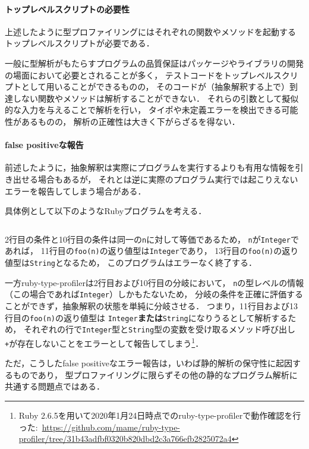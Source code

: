 \paragraph{トップレベルスクリプトの必要性}

上述したように型プロファイリングにはそれぞれの関数やメソッドを起動する
トップレベルスクリプトが必要である．

一般に型解析がもたらすプログラムの品質保証はパッケージやライブラリの開発の場面において必要とされることが多く，
テストコードをトップレベルスクリプトとして用いることができるものの，
そのコードが（抽象解釈する上で）到達しない関数やメソッドは解析することができない．
それらの引数として擬似的な入力を与えることで解析を行い，
タイポや未定義エラーを検出できる可能性があるものの，
解析の正確性は大きく下がらざるを得ない．

\paragraph{false positiveな報告}

前述したように，抽象解釈は実際にプログラムを実行するよりも有用な情報を引き出せる場合もあるが，
それとは逆に実際のプログラム実行では起こりえないエラーを報告してしまう場合がある．

具体例として以下のようなRubyプログラムを考える．

\inputminted[frame=lines, linenos]{ruby}{src/false_positive.rb}

2行目の条件と10行目の条件は同一の\verb|n|に対して等価であるため，
\verb|n|が\verb|Integer|であれば，
11行目の\verb|foo(n)|の返り値型は\verb|Integer|であり，
13行目の\verb|foo(n)|の返り値型は\verb|String|となるため，
このプログラムはエラーなく終了する．

一方ruby-type-profilerは2行目および10行目の分岐において，
\verb|n|の型レベルの情報（この場合であれば\verb|Integer|）しかもたないため，
分岐の条件を正確に評価することができず，抽象解釈の状態を単純に分岐させる．
つまり，11行目および13行目の\verb|foo(n)|の返り値型は
\verb|Integer|\textbf{または}\verb|String|になりうるとして解析するため，
それぞれの行で\verb|Integer|型と\verb|String|型の変数を受け取るメソッド呼び出し
\verb|+|が存在しないことをエラーとして報告してしまう\footnote{
  Ruby 2.6.5を用いて2020年1月24日時点でのruby-type-profilerで動作確認を行った:\
  \url{https://github.com/mame/ruby-type-profiler/tree/31b43adfbf0320b820dbd2c3a766efb2825072a4}
}．

ただ，こうしたfalse positiveなエラー報告は，いわば静的解析の保守性に起因するものであり，
型プロファイリングに限らずその他の静的なプログラム解析に共通する問題点ではある．

